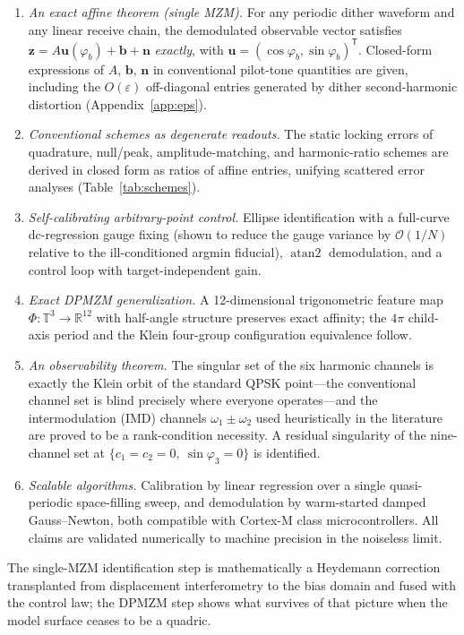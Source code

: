 \documentclass[journal]{IEEEtran}
\newcommand{\zv}{\mathbf{z}}
\newcommand{\uv}{\mathbf{u}}
\newcommand{\bv}{\mathbf{b}}
\newcommand{\nv}{\mathbf{n}}
\newcommand{\atan}{\operatorname{atan2}}
\newcommand{\T}{\mathsf{T}}
\begin{document}
\begin{enumerate}
\item \emph{An exact affine theorem (single MZM).} For any periodic
dither waveform and any linear receive chain, the demodulated observable
vector satisfies $\zv = A\uv(\varphi_b)+\bv+\nv$ \emph{exactly}, with
$\uv=(\cos\varphi_b,\sin\varphi_b)^{\T}$. Closed-form expressions of
$A$, $\bv$, $\nv$ in conventional pilot-tone quantities are given,
including the $O(\varepsilon)$ off-diagonal entries generated by dither
second-harmonic distortion (Appendix~\ref{app:eps}).
\item \emph{Conventional schemes as degenerate readouts.} The static
locking errors of quadrature, null/peak, amplitude-matching, and
harmonic-ratio schemes are derived in closed form as ratios of affine
entries, unifying scattered error analyses
(Table~\ref{tab:schemes}).
\item \emph{Self-calibrating arbitrary-point control.} Ellipse
identification with a full-curve dc-regression gauge fixing (shown to
reduce the gauge variance by $\mathcal{O}(1/N)$ relative to the
ill-conditioned argmin fiducial), $\atan$ demodulation, and a control
loop with target-independent gain.
\item \emph{Exact DPMZM generalization.} A 12-dimensional trigonometric
feature map $\Phi:\mathbb{T}^3\to\mathbb{R}^{12}$ with half-angle
structure preserves exact affinity; the $4\pi$ child-axis period and the
Klein four-group configuration equivalence follow.
\item \emph{An observability theorem.} The singular set of the six
harmonic channels is exactly the Klein orbit of the standard QPSK
point---the conventional channel set is blind precisely where everyone
operates---and the intermodulation (IMD) channels
$\omega_1\!\pm\!\omega_2$ used heuristically in the literature
\cite{kawakami2012} are proved to be a rank-condition necessity. A
residual singularity of the nine-channel set at
$\{c_1{=}c_2{=}0,\ \sin\varphi_3{=}0\}$ is identified.
\item \emph{Scalable algorithms.} Calibration by linear regression over
a single quasi-periodic space-filling sweep, and demodulation by
warm-started damped Gauss--Newton, both compatible with Cortex-M class
microcontrollers. All claims are validated numerically to machine
precision in the noiseless limit.
\end{enumerate}

The single-MZM identification step is mathematically a Heydemann
correction \cite{heydemann1981,fitzgibbon1999} transplanted from
displacement interferometry to the bias domain and fused with the
control law; the DPMZM step shows what survives of that picture when
the model surface ceases to be a quadric.
\end{document}
